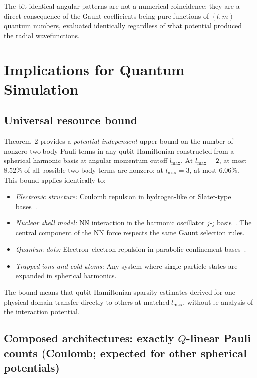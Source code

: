 \documentclass[twocolumn,pra,amsmath,amssymb,superscriptaddress]{revtex4-2}
\begin{document}
\noindent The bit-identical angular patterns are not a numerical
coincidence: they are a direct consequence of the Gaunt coefficients
being pure functions of $(l, m)$ quantum numbers, evaluated
identically regardless of what potential produced the radial
wavefunctions.

\section{Implications for Quantum Simulation}
\label{sec:implications}

\subsection{Universal resource bound}

Theorem~2 provides a \textit{potential-independent} upper bound on
the number of nonzero two-body Pauli terms in any qubit Hamiltonian
constructed from a spherical harmonic basis at angular momentum
cutoff $l_{\max}$.  At $l_{\max} = 2$, at most $8.52\%$ of all
possible two-body terms are nonzero; at $l_{\max}=3$, at most
$6.06\%$.  This bound applies identically to:

\begin{itemize}
\item \textit{Electronic structure:} Coulomb repulsion in
  hydrogen-like or Slater-type bases~\cite{GeoVac_Paper14}.
\item \textit{Nuclear shell model:} NN interaction in the harmonic
  oscillator $j$-$j$ basis~\cite{Suhonen2007}.  The central
  component of the NN force respects the same Gaunt selection
  rules.
\item \textit{Quantum dots:} Electron--electron repulsion in
  parabolic confinement bases~\cite{Reimann2002}.
\item \textit{Trapped ions and cold atoms:} Any system where
  single-particle states are expanded in spherical harmonics.
\end{itemize}

The bound means that qubit Hamiltonian sparsity estimates derived
for one physical domain transfer directly to others at matched
$l_{\max}$, without re-analysis of the interaction potential.

\subsection{Composed architectures: exactly $Q$-linear Pauli counts
(Coulomb; expected for other spherical potentials)}
\end{document}
